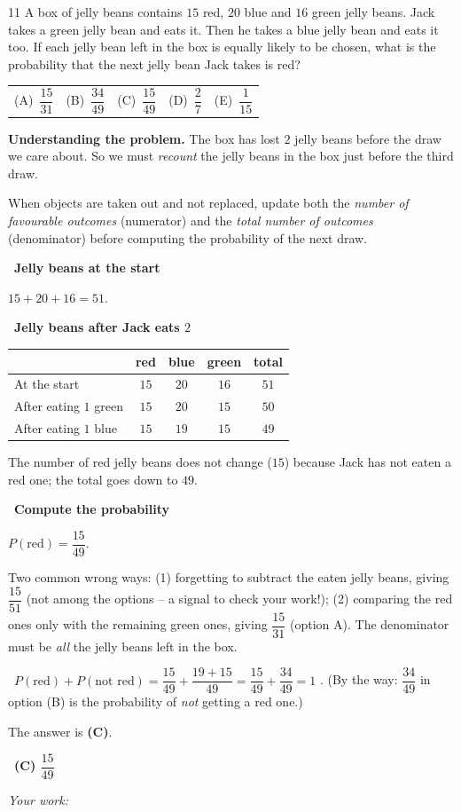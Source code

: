 \documentclass[11pt]{article}
\makeatletter
\newif\ifsol \solfalse
\providecommand{\AnsWord}{Đáp số}
\newenvironment{probbox}[2]{\begin{probboxT}{#1}{#2}}{\end{probboxT}}
\newcommand{\StuProb}[2]{\begin{probboxS}{#1}{#2}\StuProbBody\end{probboxS}}
\newcommand{\ans}[1]{\par\smallskip{\bfseries\color{tmGreen!88!black}\AnsWord:}\ {\bfseries\color{AnsRed}#1}\par}
\newcommand{\probsol}[1]{%
  \begin{lrbox}{\solmeasure}\begin{minipage}{\dimexpr\linewidth-24pt\relax}#1\end{minipage}\end{lrbox}%
  \ifsol
    \begin{solbox}#1\end{solbox}%
  \else
    \setlength{\solht}{\dimexpr\ht\solmeasure+\dp\solmeasure+0.85cm\relax}%
    \ifdim\solht<1.35cm\setlength{\solht}{1.35cm}\fi
    \ifdim\solht>\StudentMaxWork\setlength{\solht}{\StudentMaxWork}\fi
    \par\noindent\begin{minipage}{\linewidth}%
    \expandafter\StuProb\StuProbArgs
    \begin{tcolorbox}[colback=white,colframe=Line,boxrule=0.8pt,arc=5pt,
      left=8pt,right=8pt,top=4pt,bottom=4pt,height=\solht]{\footnotesize\color{Slate}\itshape\WorkWord}\end{tcolorbox}%
    \end{minipage}\par\medskip
  \fi}
\newlength{\StudentMaxWork}\setlength{\StudentMaxWork}{4.5cm}
\newcommand{\step}[2]{\par\smallskip\noindent{\bfseries\color{tmBlue!85!black}\StepWord~#1.}\ {\bfseries #2}\par\nopagebreak}
\newcommand{\verify}[1]{\par\smallskip\noindent{\bfseries\color{tmGreen!80!black}\faCheckCircle\ \CheckWord}\ #1\par}
\newcommand{\choices}[5]{\par\smallskip\noindent
  \begin{tabularx}{\linewidth}{@{}XXXXX@{}}(A)\ #1&(B)\ #2&(C)\ #3&(D)\ #4&(E)\ #5\end{tabularx}\par}
\def\WorkWord{Your work:}
\def\AnsWord{Answer}
\def\StepWord{Step}
\def\CheckWord{Check:}
\makeatother
\begin{document}
\begin{probbox}{11}{\relax}
A box of jelly beans contains $15$ red, $20$ blue and $16$ green jelly beans. Jack takes a green jelly bean and eats it. Then he takes a blue jelly bean and eats it too. If each jelly bean left in the box is equally likely to be chosen, what is the probability that the next jelly bean Jack takes is red?
\choices{$\dfrac{15}{31}$}{$\dfrac{34}{49}$}{$\dfrac{15}{49}$}{$\dfrac{2}{7}$}{$\dfrac{1}{15}$}
\end{probbox}
\probsol{
\textbf{Understanding the problem.} The box has lost $2$ jelly beans before the draw we care about. So we must \emph{recount} the jelly beans in the box just before the third draw.
\begin{recallbox}When objects are taken out and not replaced, update both the \emph{number of favourable outcomes} (numerator) and the \emph{total number of outcomes} (denominator) before computing the probability of the next draw.\end{recallbox}
\step{1}{Jelly beans at the start}
$15+20+16=51$.
\step{2}{Jelly beans after Jack eats $2$}
\begin{center}
\begin{tabular}{|l|c|c|c|c|}\hline
 & red & blue & green & total\\ \hline
At the start & $15$ & $20$ & $16$ & $51$\\ \hline
After eating $1$ green & $15$ & $20$ & $15$ & $50$\\ \hline
After eating $1$ blue & $15$ & $19$ & $15$ & $49$\\ \hline
\end{tabular}
\end{center}
The number of red jelly beans does not change ($15$) because Jack has not eaten a red one; the total goes down to $49$.
\step{3}{Compute the probability}
$P(\text{red})=\dfrac{15}{49}$.
\begin{warnbox}Two common wrong ways: (1) forgetting to subtract the eaten jelly beans, giving $\dfrac{15}{51}$ (not among the options -- a signal to check your work!); (2) comparing the red ones only with the remaining green ones, giving $\dfrac{15}{31}$ (option A). The denominator must be \emph{all} the jelly beans left in the box.\end{warnbox}
\verify{$P(\text{red})+P(\text{not red})=\dfrac{15}{49}+\dfrac{19+15}{49}=\dfrac{15}{49}+\dfrac{34}{49}=1$ \checkmark. (By the way: $\dfrac{34}{49}$ in option (B) is the probability of \emph{not} getting a red one.)}
The answer is \textbf{(C)}.
\ans{(C) $\dfrac{15}{49}$}
}
\end{document}
